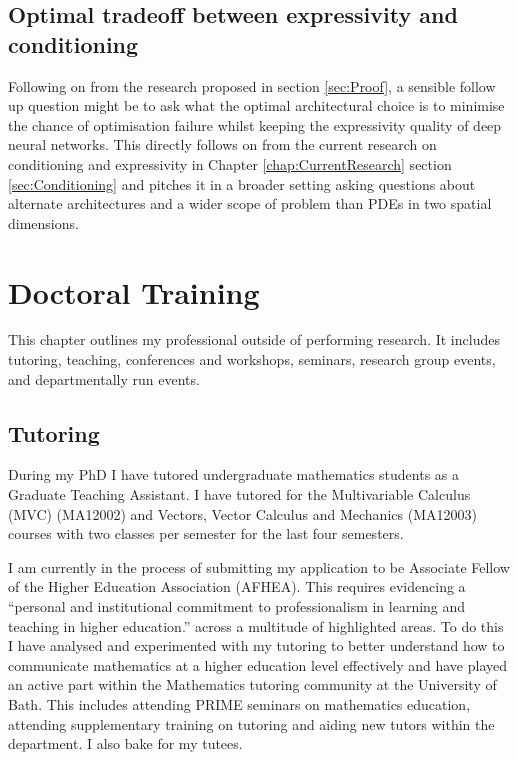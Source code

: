 \documentclass[11pt, onecolumn]{report}
\begin{document}
\section{Optimal tradeoff between expressivity and conditioning}
Following on from the research proposed in section \ref{sec:Proof}, a sensible follow up question might be to ask what the optimal architectural choice is to minimise the chance of optimisation failure whilst keeping the expressivity quality of deep neural networks. This directly follows on from the current research on conditioning and expressivity in Chapter \ref{chap:CurrentResearch} section \ref{sec:Conditioning} and pitches it in a broader setting asking questions about alternate architectures and a wider scope of problem than PDEs in two spatial dimensions.

\chapter{Doctoral Training}
This chapter outlines my professional outside of performing research. It includes tutoring, teaching, conferences and workshops, seminars, research group events, and departmentally run events.

\section{Tutoring}
During my PhD I have tutored undergraduate mathematics students as a Graduate Teaching Assistant. I have tutored for the Multivariable Calculus (MVC) (MA12002) and Vectors, Vector Calculus and Mechanics (MA12003) courses with two classes per semester for the last four semesters.

 I am currently in the process of submitting my application to be  Associate Fellow of the Higher Education Association (AFHEA). \cite{AFHEA} This requires evidencing a ``personal and institutional commitment to professionalism in learning and teaching in higher education.'' across a multitude of highlighted areas. To do this I have analysed and experimented with my tutoring to better understand how to communicate mathematics at a higher education level effectively and have played an active part within the Mathematics tutoring community at the University of Bath. This includes attending PRIME seminars on mathematics education, attending supplementary training on tutoring and aiding new tutors within the department. I also bake for my tutees. 
 
\end{document}
